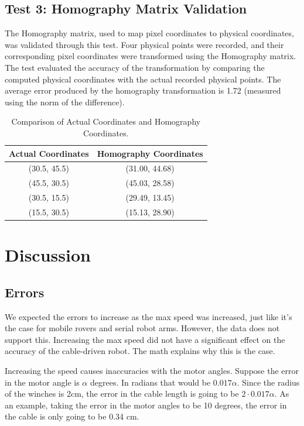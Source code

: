 \documentclass[11pt]{article}
\begin{document}
\newpage
\subsection{Test 3: Homography Matrix Validation}
The Homography matrix, used to map pixel coordinates to physical coordinates, was validated through this test. Four physical points were recorded, and their corresponding pixel coordinates were transformed using the Homography matrix. The test evaluated the accuracy of the transformation by comparing the computed physical coordinates with the actual recorded physical points.
The average error produced by the homography transformation is 1.72 (measured using the norm of the difference).
\begin{table}[h]
\centering
\begin{tabular}{|c|c|}
\hline
\textbf{Actual Coordinates} & \textbf{Homography Coordinates} \\
\hline
(30.5, 45.5) & (31.00, 44.68) \\
\hline
(45.5, 30.5) & (45.03, 28.58) \\
\hline
(30.5, 15.5) & (29.49, 13.45) \\
\hline
(15.5, 30.5) & (15.13, 28.90) \\
\hline
\end{tabular}
\caption{Comparison of Actual Coordinates and Homography Coordinates.}
\label{tab:coordinates_comparison}
\end{table}

\section{Discussion}

\subsection{Errors}
We expected the errors to increase as the max speed was increased, just like it's the case for mobile rovers and serial robot arms. 
However, the data does not support this. Increasing the max speed did not have a significant effect on the accuracy of the 
cable-driven robot. The math explains why this is the case.

Increasing the speed causes inaccuracies with the motor angles. Suppose the error in the motor angle is $\alpha$ degrees. In
radians that would be $0.017\alpha$. Since the radius of the winches is 2cm, the error in the cable length is going to be
$2 \cdot 0.017\alpha$. As an example, taking the error in the motor angles to be 10 degrees, the error in the cable is only
going to be 0.34 cm.
\end{document}

